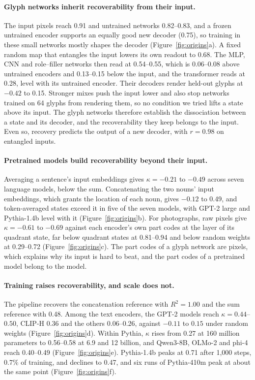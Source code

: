 \documentclass[10pt]{article}
\theoremstyle{plain}
\theoremstyle{remark}
\begin{document}
\paragraph{Glyph networks inherit recoverability from their input.} The input pixels reach 0.91 and untrained networks 0.82--0.83, and a frozen untrained encoder supports an equally good new decoder (0.75), so training in these small networks mostly shapes the decoder (Figure~\ref{fig:origins}a). A fixed random map that entangles the input lowers its own readout to 0.68. The MLP, CNN and role--filler networks then read at 0.54--0.55, which is 0.06--0.08 above untrained encoders and 0.13--0.15 below the input, and the transformer reads at 0.28, level with its untrained encoder. Their decoders render held-out glyphs at $-0.42$ to 0.15. Stronger mixes push the input lower and also stop networks trained on 64 glyphs from rendering them, so no condition we tried lifts a state above its input. The glyph networks therefore establish the dissociation between a state and its decoder, and the recoverability they keep belongs to the input. Even so, recovery predicts the output of a new decoder, with $r = 0.98$ on entangled inputs.

\paragraph{Pretrained models build recoverability beyond their input.} Averaging a sentence's input embeddings gives $\kappa = -0.21$ to $-0.49$ across seven language models, below the sum. Concatenating the two nouns' input embeddings, which grants the location of each noun, gives $-0.12$ to 0.49, and token-averaged states exceed it in five of the seven models, with GPT-2 large and Pythia-1.4b level with it (Figure~\ref{fig:origins}b). For photographs, raw pixels give $\kappa = -0.61$ to $-0.69$ against each encoder's own part codes at the layer of its quadrant state, far below quadrant states at 0.81--0.94 and below random weights at 0.29--0.72 (Figure~\ref{fig:origins}c). The part codes of a glyph network are pixels, which explains why its input is hard to beat, and the part codes of a pretrained model belong to the model.

\paragraph{Training raises recoverability, and scale does not.} The pipeline recovers the concatenation reference with $R^2 = 1.00$ and the sum reference with 0.48. Among the text encoders, the GPT-2 models reach $\kappa = 0.44$--$0.50$, CLIP-H 0.36 and the others 0.06--0.26, against $-0.11$ to $0.15$ under random weights (Figure~\ref{fig:origins}d). Within Pythia, $\kappa$ rises from 0.27 at 160 million parameters to 0.56--0.58 at 6.9 and 12 billion, and Qwen3-8B, OLMo-2 and phi-4 reach 0.40--0.49 (Figure~\ref{fig:origins}e). Pythia-1.4b peaks at 0.71 after 1{,}000 steps, 0.7\% of training, and declines to 0.47, and six runs of Pythia-410m peak at about the same point (Figure~\ref{fig:origins}f).
\end{document}
